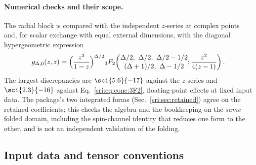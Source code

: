 \paragraph{Numerical checks and their scope.} The radial block is compared with the independent $z$-series at complex
points and, for scalar exchange with equal external dimensions, with the diagonal hypergeometric expression
\begin{equation}
 g_{\Delta,0}(z,z)=\Bigl(\frac{z^2}{1-z}\Bigr)^{\Delta/2}
 {}_3F_2\!\left(\begin{matrix}\Delta/2,\ \Delta/2,\ \Delta/2-1/2\\[1pt](\Delta+1)/2,\ \Delta-1/2\end{matrix};
 \frac{z^2}{4(z-1)}\right).
 \label{sri:eq:cone:3F2}
\end{equation}
The largest discrepancies are $\sci{5.6}{-17}$ against the $z$-series and $\sci{2.3}{-16}$ against
Eq.~\eqref{sri:eq:cone:3F2}, floating-point effects at fixed input data. The
package's two integrated forms (Sec.~\ref{sri:sec:retained}) agree on the retained coefficients; this checks the algebra
and the bookkeeping on the \emph{same} folded domain, including the spin-channel identity that reduces one form to the
other, and is not an independent validation of the folding.

\subsection{Input data and tensor conventions}\label{sri:app:cone:inputs}
